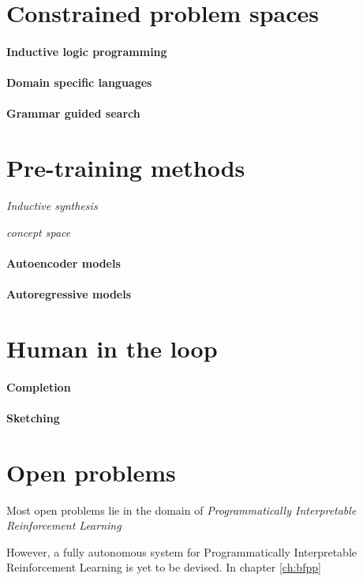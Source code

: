 \section{Constrained problem spaces}

\paragraph{Inductive logic programming}

\paragraph{Domain specific languages}

\paragraph{Grammar guided search}

\section{Pre-training methods}

\emph{Inductive synthesis}

\emph{concept space}

\paragraph{Autoencoder models}

\paragraph{Autoregressive models}

\section{Human in the loop}

\paragraph{Completion}

\paragraph{Sketching}

\section{Open problems}

Most open problems lie in the domain of \emph{Programmatically Interpretable Reinforcement Learning}

However, a fully autonomous system for Programmatically Interpretable Reinforcement Learning is yet to be devised. In chapter \ref{ch:bfpp}